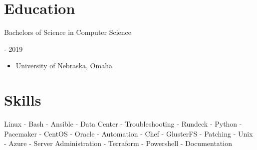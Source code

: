 \documentclass[10pt, a4paper]{article}
\begin{document}
\section*{Education}
    \begin{minipage}{0.5\textwidth} %
        \raggedright %
        Bachelors of Science in Computer Science
      \end{minipage}
      \begin{minipage}{0.5\textwidth} %
         \-- 2019
      \end{minipage}
      \begin{itemize}
      \item University of Nebraska, Omaha
    \end{itemize}

\section*{Skills}
Linux - Bash - Ansible - Data Center - Troubleshooting - Rundeck - Python - Pacemaker - CentOS - Oracle - Automation - Chef - GlusterFS - Patching - Unix - Azure - Server Administration - Terraform - Powershell - Documentation
\end{document}
